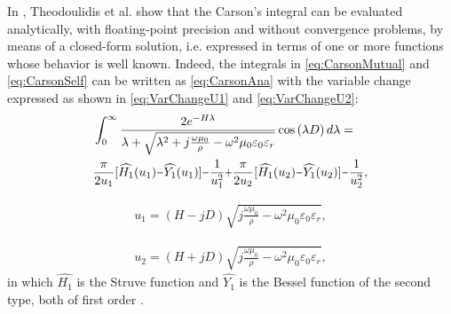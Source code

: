 \documentclass[conference]{IEEEtran}
\begin{document}
	In \cite{Theodoulidis2015}, Theodoulidis et al. show that the Carson's integral can be evaluated analytically, with floating-point precision and without convergence problems, by means of a closed-form solution, i.e.  expressed in terms of one or more functions whose behavior is well known. Indeed, the integrals in \eqref{eq:CarsonMutual} and \eqref{eq:CarsonSelf} can be written as \eqref{eq:CarsonAna} with the variable change expressed as shown in \eqref{eq:VarChangeU1} and \eqref{eq:VarChangeU2}:
	\begin{equation}\label{eq:CarsonAna}
		\begin{aligned}
			&\int_{0}^{\infty}\frac{2e^{-H\lambda}}{\lambda+\sqrt{\lambda^2+j\frac{\omega\mu_{0}}{\rho}-\omega^2\mu_{0}\varepsilon_{0}\varepsilon_{r}}}\cos\left( \lambda D \right) d\lambda= \\
			&\frac{\pi}{2u_1}[\widehat{H_1}(u_1)\scalebox{0.75}[1.0]{\( - \)}\widehat{Y_1}(u_1)]\scalebox{0.75}[1.0]{\( - \)}\frac{1}{u_1^2}\scalebox{0.75}[1.0]{\( + \)}\frac{\pi}{2u_2}[\widehat{H_1}(u_2)\scalebox{0.75}[1.0]{\( - \)}\widehat{Y_1}(u_2)]\scalebox{0.75}[1.0]{\( - \)}\frac{1}{u_2^2},
		\end{aligned}
	\end{equation}
	
	\begin{equation}\label{eq:VarChangeU1}
		\begin{aligned}
			u_1=(H-jD)\sqrt{j\frac{\omega\mu_0}{\rho}-\omega^2\mu_0\varepsilon_0\varepsilon_r},
		\end{aligned}
	\end{equation}
	
	\begin{equation}\label{eq:VarChangeU2}
		\begin{aligned}
			u_2=(H+jD)\sqrt{j\frac{\omega\mu_0}{\rho}-\omega^2\mu_0\varepsilon_0\varepsilon_r},
		\end{aligned}
	\end{equation}
	in which $\widehat{H_1}$ is the Struve function and $\widehat{Y_1}$ is the Bessel function of the second type, both of first order \cite{Theodoulidis2015}.
	
\end{document}
